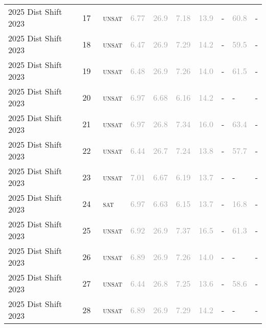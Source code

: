 \begin{center}
{\begin{longtable}{@{}llllllllll@{}}
2025 Dist Shift 2023 & 17 & ~\textsc{unsat} & \textcolor{darkgray}{6.77} & \textcolor{darkgray}{26.9} & \textcolor{darkgray}{7.18} & \textcolor{darkgray}{13.9} & - & \textcolor{darkgray}{60.8} & - \\
2025 Dist Shift 2023 & 18 & ~\textsc{unsat} & \textcolor{darkgray}{6.47} & \textcolor{darkgray}{26.9} & \textcolor{darkgray}{7.29} & \textcolor{darkgray}{14.2} & - & \textcolor{darkgray}{59.5} & - \\
2025 Dist Shift 2023 & 19 & ~\textsc{unsat} & \textcolor{darkgray}{6.48} & \textcolor{darkgray}{26.9} & \textcolor{darkgray}{7.26} & \textcolor{darkgray}{14.0} & - & \textcolor{darkgray}{61.5} & - \\
2025 Dist Shift 2023 & 20 & ~\textsc{unsat} & \textcolor{darkgray}{6.97} & \textcolor{darkgray}{6.68} & \textcolor{darkgray}{6.16} & \textcolor{darkgray}{14.2} & - & - & - \\
2025 Dist Shift 2023 & 21 & ~\textsc{unsat} & \textcolor{darkgray}{6.97} & \textcolor{darkgray}{26.8} & \textcolor{darkgray}{7.34} & \textcolor{darkgray}{16.0} & - & \textcolor{darkgray}{63.4} & - \\
2025 Dist Shift 2023 & 22 & ~\textsc{unsat} & \textcolor{darkgray}{6.44} & \textcolor{darkgray}{26.7} & \textcolor{darkgray}{7.24} & \textcolor{darkgray}{13.8} & - & \textcolor{darkgray}{57.7} & - \\
2025 Dist Shift 2023 & 23 & ~\textsc{unsat} & \textcolor{darkgray}{7.01} & \textcolor{darkgray}{6.67} & \textcolor{darkgray}{6.19} & \textcolor{darkgray}{13.7} & - & - & - \\
2025 Dist Shift 2023 & 24 & ~\textsc{sat} & \textcolor{darkgray}{6.97} & \textcolor{darkgray}{6.63} & \textcolor{darkgray}{6.15} & \textcolor{darkgray}{13.7} & - & \textcolor{darkgray}{16.8} & - \\
2025 Dist Shift 2023 & 25 & ~\textsc{unsat} & \textcolor{darkgray}{6.92} & \textcolor{darkgray}{26.9} & \textcolor{darkgray}{7.37} & \textcolor{darkgray}{16.5} & - & \textcolor{darkgray}{61.3} & - \\
2025 Dist Shift 2023 & 26 & ~\textsc{unsat} & \textcolor{darkgray}{6.89} & \textcolor{darkgray}{26.9} & \textcolor{darkgray}{7.26} & \textcolor{darkgray}{14.0} & - & - & - \\
2025 Dist Shift 2023 & 27 & ~\textsc{unsat} & \textcolor{darkgray}{6.44} & \textcolor{darkgray}{26.8} & \textcolor{darkgray}{7.25} & \textcolor{darkgray}{13.6} & - & \textcolor{darkgray}{58.6} & - \\
2025 Dist Shift 2023 & 28 & ~\textsc{unsat} & \textcolor{darkgray}{6.89} & \textcolor{darkgray}{26.9} & \textcolor{darkgray}{7.29} & \textcolor{darkgray}{14.2} & - & - & - \\

\end{longtable}}
\end{center}
